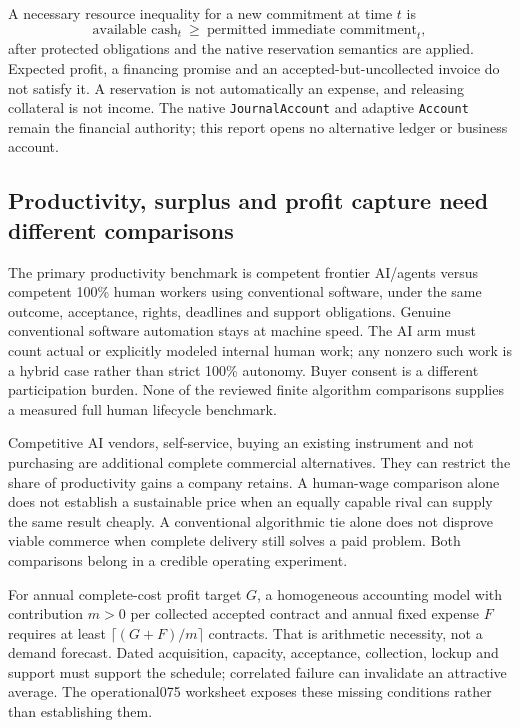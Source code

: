 \documentclass[11pt,letterpaper]{article}
\begin{document}
A necessary resource inequality for a new commitment at time $t$ is
\begin{equation}
\text{available cash}_t\ \geq\ \text{permitted immediate commitment}_t,
\end{equation}
after protected obligations and the native reservation semantics are applied. Expected profit, a financing promise and an accepted-but-uncollected invoice do not satisfy it. A reservation is not automatically an expense, and releasing collateral is not income. The native \texttt{JournalAccount} and adaptive \texttt{Account} remain the financial authority; this report opens no alternative ledger or business account.

\subsection{Productivity, surplus and profit capture need different comparisons}
The primary productivity benchmark is competent frontier AI/agents versus competent 100\% human workers using conventional software, under the same outcome, acceptance, rights, deadlines and support obligations. Genuine conventional software automation stays at machine speed. The AI arm must count actual or explicitly modeled internal human work; any nonzero such work is a hybrid case rather than strict 100\% autonomy. Buyer consent is a different participation burden. None of the reviewed finite algorithm comparisons supplies a measured full human lifecycle benchmark.

Competitive AI vendors, self-service, buying an existing instrument and not purchasing are additional complete commercial alternatives. They can restrict the share of productivity gains a company retains. A human-wage comparison alone does not establish a sustainable price when an equally capable rival can supply the same result cheaply. A conventional algorithmic tie alone does not disprove viable commerce when complete delivery still solves a paid problem. Both comparisons belong in a credible operating experiment.

For annual complete-cost profit target $G$, a homogeneous accounting model with contribution $m>0$ per collected accepted contract and annual fixed expense $F$ requires at least $\lceil(G+F)/m\rceil$ contracts. That is arithmetic necessity, not a demand forecast. Dated acquisition, capacity, acceptance, collection, lockup and support must support the schedule; correlated failure can invalidate an attractive average. The operational075 worksheet exposes these missing conditions rather than establishing them.
\end{document}
